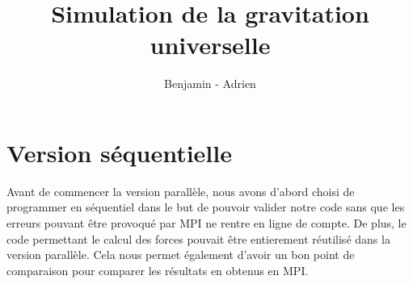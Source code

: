 \documentclass{article}
\title{Simulation de la gravitation universelle}
\author{Benjamin \bsc{Angelaud} - Adrien \bsc{Guilbaud}}
\begin{document}
\maketitle





\section{Version séquentielle}
Avant de commencer la version parallèle, nous avons d'abord choisi de programmer en séquentiel dans le but de pouvoir valider notre code sans que les erreurs pouvant être provoqué par MPI ne rentre en ligne de compte. De plus, le code permettant le calcul des forces pouvait être entierement réutilisé dans la version parallèle. Cela nous permet également d'avoir un bon point de comparaison pour comparer les résultats en obtenus en MPI.
\end{document}
